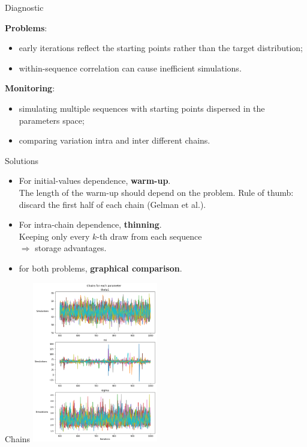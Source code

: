 \begin{frame}{Diagnostic}

\textbf{Problems}: \begin{itemize}
	\item early iterations reflect the starting points rather than the target distribution;
	\item within-sequence correlation can cause inefficient simulations. 
\end{itemize}
\vspace{.2in}
\textbf{Monitoring}: \begin{itemize}
	\item simulating multiple sequences with starting points dispersed in the parameters space;
	\item comparing variation intra and inter different chains.
\end{itemize}

\end{frame}


\begin{frame}{Solutions}

	\begin{itemize}
		\item For initial-values dependence, \textbf{warm-up}.\\
		The length of the warm-up should depend on the problem. Rule of thumb: discard the first half of each chain (Gelman et al.).\\
		\vspace{.2in}	
		\item For intra-chain dependence, \textbf{thinning}.\\
		Keeping only every $k$-th draw from each sequence\\
		$\Rightarrow$ storage advantages.\\
		\vspace{.2in}
		\item for both problems, \textbf{graphical comparison}.\\
	\end{itemize}	

\end{frame}

\begin{frame}{Chains}
		\centering
		\includegraphics[width=\textwidth,height=7cm]{images/chains}
\end{frame}

